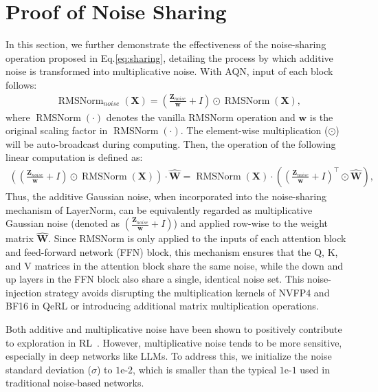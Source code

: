 \section{Proof of Noise Sharing}\label{ap:proof}
In this section, we further demonstrate the effectiveness of the noise-sharing operation proposed in Eq.\ref{eq:sharing}, detailing the process by which additive noise is transformed into multiplicative noise. With AQN, input of each block follows:
\begin{align}\label{eq:ap_1}
\operatorname{RMSNorm}_{noise}(\mathbf{X}) = (\frac{\mathbf{Z}_{noise}}{\mathbf{w}} +  I)\odot \operatorname{RMSNorm}(\mathbf{X}), 
\end{align}
where $\operatorname{RMSNorm}(\cdot)$ denotes the vanilla RMSNorm operation and $\mathbf{w}$ is the original scaling factor in $\operatorname{RMSNorm}(\cdot)$. The element-wise multiplication ($\odot$) will be auto-broadcast during computing. Then, the operation of the following linear computation is defined as:
\begin{align}\label{eq:ap_2}
 ((\frac{\mathbf{Z}_{noise}}{\mathbf{w}} +  I)\odot \operatorname{RMSNorm}(\mathbf{X})) \cdot \hat{\mathbf{W}} = \operatorname{RMSNorm}(\mathbf{X}) \cdot ((\frac{\mathbf{Z}_{noise}}{\mathbf{w}} +  I)^\top \odot \hat{\mathbf{W}}), 
\end{align}
Thus, the additive Gaussian noise, when incorporated into the noise-sharing mechanism of LayerNorm, can be equivalently regarded as multiplicative Gaussian noise (denoted as $(\frac{\mathbf{Z}_{noise}}{\mathbf{w}} +  I)$) and applied row-wise to the weight matrix $\hat{\mathbf{W}}$. Since RMSNorm is only applied to the inputs of each attention block and feed-forward network (FFN) block, this mechanism ensures that the Q, K, and V matrices in the attention block share the same noise, while the down and up layers in the FFN block also share a single, identical noise set. This noise-injection strategy avoids disrupting the multiplication kernels of NVFP4 and BF16 in QeRL or introducing additional matrix multiplication operations. 

Both additive and multiplicative noise have been shown to positively contribute to exploration in RL~\citep{plappert2017parameter,higuera2018synthesizing,chen2025concentration}. However, multiplicative noise tends to be more sensitive, especially in deep networks like LLMs. To address this, we initialize the noise standard deviation ($\sigma$) to $1\text{e-}2$, which is smaller than the typical $1\text{e-}1$ used in traditional noise-based networks.

